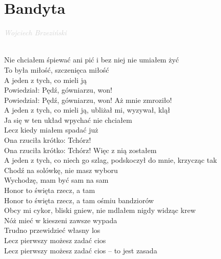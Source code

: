 \documentclass[a5paper, 10pt]{book}
\begin{document}
\newpage
\section{Bandyta}\textcolor{lightgray}{\textit{Wojciech Brzeziński}}\\~\\
\begin{minipage}[t]{0.81\textwidth}
  Nie chciałem śpiewać ani pić i bez niej nie umiałem żyć\\
  To była miłość, szczenięca miłość\\
\hspace*{5mm}  A jeden z tych, co mieli ją\\
\hspace*{5mm}  Powiedział: Pędź, gówniarzu, won!\\
\hspace*{5mm}  Powiedział: Pędź, gówniarzu, won! Aż mnie zmroziło!\\
  
  A jeden z tych, co mieli ją, ubliżał mi, wyzywał, klął\\
  Ja się w ten układ wpychać nie chciałem\\
\hspace*{5mm}Lecz kiedy miałem spadać już\\
\hspace*{5mm}Ona rzuciła krótko: Tchórz!\\
\hspace*{5mm}Ona rzuciła krótko: Tchórz! Więc z nią zostałem\\

A jeden z tych, co niech go szlag, podskoczył do mnie, krzycząc tak\\
Chodź na solówkę, nie masz wyboru\\
\hspace*{5mm}Wychodzę, mam być sam na sam\\
\hspace*{5mm}Honor to święta rzecz, a tam\\
\hspace*{5mm}Honor to święta rzecz, a tam ośmiu bandziorów\\

Obcy mi cykor, bliski gniew, nie mdlałem nigdy widząc krew\\
Nóż mieć w kieszeni zawsze wypada\\
\hspace*{5mm}Trudno przewidzieć własny los\\
\hspace*{5mm}Lecz pierwszy możesz zadać cios\\
\hspace*{5mm}Lecz pierwszy możesz zadać cios – to jest zasada\\


\end{minipage}
\end{document}
